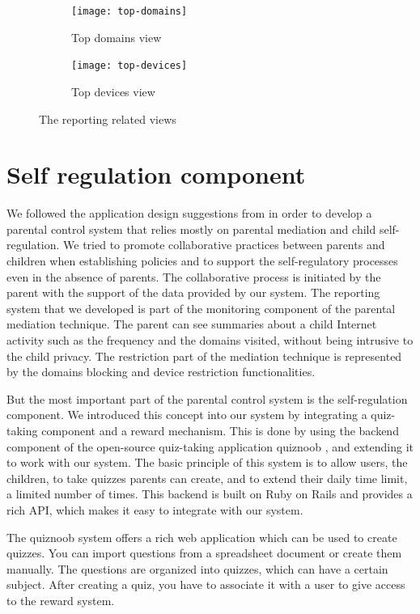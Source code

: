 \begin{figure}
\centering
\begin{subfigure}{.5\textwidth}
  \centering
  \texttt{[image: top-domains]}
  \caption{Top domains view}
  \label{fig:top-domains}
\end{subfigure}%
\begin{subfigure}{.5\textwidth}
  \centering
  \texttt{[image: top-devices]}
  \caption{Top devices view}
  \label{fig:top-devices}
\end{subfigure}
\caption{The reporting related views}
\label{fig:top-views}
\end{figure}

\section{Self regulation component}

We followed the application design suggestions from \citep{wisniewski2017parental} in order to develop a parental control system that relies mostly on parental mediation and child self-regulation. We tried to promote collaborative practices between parents and children when establishing policies and to support the self-regulatory processes even in the absence of parents. The collaborative process is initiated by the parent with the support of the data provided by our system. The reporting system that we developed is part of the monitoring component of the parental mediation technique. The parent can see summaries about a child Internet activity such as the frequency and the domains visited, without being intrusive to the child privacy. The restriction part of the mediation technique is represented by the domains blocking and device restriction functionalities.

But the most important part of the parental control system is the self-regulation component. We introduced this concept into our system by integrating a quiz-taking component and a reward mechanism. This is done by using the backend component of the open-source quiz-taking application quiznoob \citep{callahan2018quiznoob}, and extending it to work with our system. The basic principle of this system is to allow users, the children, to take quizzes parents can create, and to extend their daily time limit, a limited number of times. This backend is built on Ruby on Rails \citep{rubyOnRails} and provides a rich API, which makes it easy to integrate with our system.

The quiznoob system offers a rich web application which can be used to create quizzes. You can import questions from a spreadsheet document or create them manually. The questions are organized into quizzes, which can have a certain subject. After creating a quiz, you have to associate it with a user to give access to the reward system.

